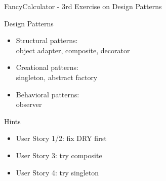 \begin{frame}
	\begin{fancycolumns}[widths={65}]
		\begin{example}{FancyCalculator - 3rd Exercise on Design Patterns}
			\begin{itemize}
				\userstoriesA
				\userstoriesB
				\userstoriesC
			\end{itemize}
		\end{example}
	\nextcolumn
		\begin{definition}{Design Patterns}
			\begin{itemize}
				\item Structural patterns:\\object adapter, composite, decorator
				\item Creational patterns:\\singleton, abstract factory
				\item Behavioral patterns:\\observer
			\end{itemize}
		\end{definition}
		\begin{note}{Hints}
			\begin{itemize}
				\item User Story 1/2: fix DRY first
				\item User Story 3: try composite
				\item User Story 4: try singleton
			\end{itemize}
		\end{note}
	\end{fancycolumns}
\end{frame}



